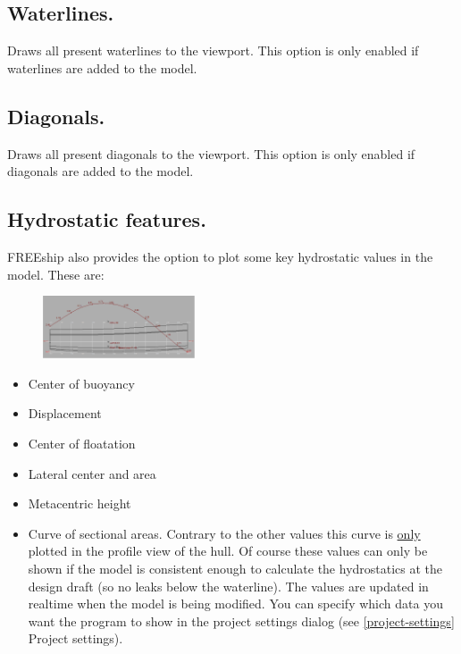 \documentclass[12pt]{article}
\begin{document}
\subsection{Waterlines.}
Draws all present waterlines to the viewport. This option is only
enabled if waterlines are added to the model.

\subsection{Diagonals.}
Draws all present diagonals to the viewport. This option is only
enabled if diagonals are added to the model.

\subsection{Hydrostatic features.} \label{hydrostatic-features}
FREEship also provides the option to plot some key hydrostatic values
in the model. These are:

\begin{figure}
        \centering
        \includegraphics[width=0.4\textwidth,natwidth=717,natheight=296]{hydrostaticfeatures.png}
        \caption{}
        \label{fig:hydrostaticfeatures}
\end{figure}

\begin{itemize}

\item Center of buoyancy

\item Displacement

\item Center of floatation

\item Lateral center and area

\item Metacentric height

\item Curve of sectional areas. Contrary to the other values this
curve is \underline{only} plotted in the profile view
of the hull. Of course these values can only be shown if the model is
consistent enough to calculate the hydrostatics at the design draft
(so no leaks below the waterline). The values are updated in realtime
when the model is being modified. You can specify which data you want
the program to show in the project settings dialog (see \ref{project-settings} Project
settings).

\end{itemize}
\end{document}
